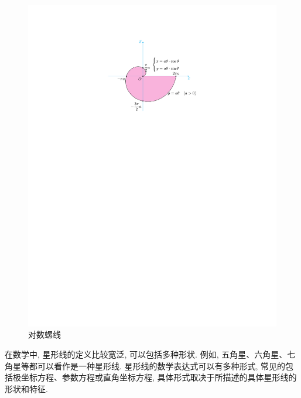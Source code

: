 \begin{figure}[H]
    \centering
    \includegraphics{figures/ArchimedesSpiral.pdf}
    \caption{对数螺线}
    \label{archimedesSpiral}
\end{figure}


在数学中, 星形线的定义比较宽泛, 可以包括多种形状. 例如, 五角星、六角星、七角星等都可以看作是一种星形线. 星形线的数学表达式可以有多种形式, 常见的包括极坐标方程、参数方程或直角坐标方程, 具体形式取决于所描述的具体星形线的形状和特征.

